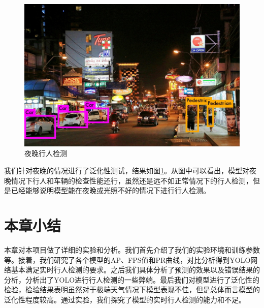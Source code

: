 {	\begin{figure}[htbp]
	\centering
	\includegraphics[width=5in]{images/night.jpg}
	\caption{夜晚行人检测}
	\label{night}
	\end{figure}
	我们针对夜晚的情况进行了泛化性测试，结果如图\ref{night}。从图中可以看出，模型对夜晚情况下行人和车辆的检查性能还行，虽然还是远不如正常情况下的行人检测，但是已经能够说明模型能在夜晚或光照不好的情况下进行行人检测。
}

\section{本章小结}{
	本章对本项目做了详细的实验和分析。我们首先介绍了我们的实验环境和训练参数等。接着，我们研究了各个模型的AP、FPS值和PR曲线，对比分析得到YOLO网络基本满足实时行人检测的要求。之后我们具体分析了预测的效果以及错误结果的分析，分析出了YOLO进行行人检测的一些弊端。最后我们对模型进行了泛化性的检验，检验结果表明虽然对于极端天气情况下模型表现不佳，但是总体而言模型的泛化性程度较高。通过实验，我们探究了模型的实时行人检测的能力和不足。
}


